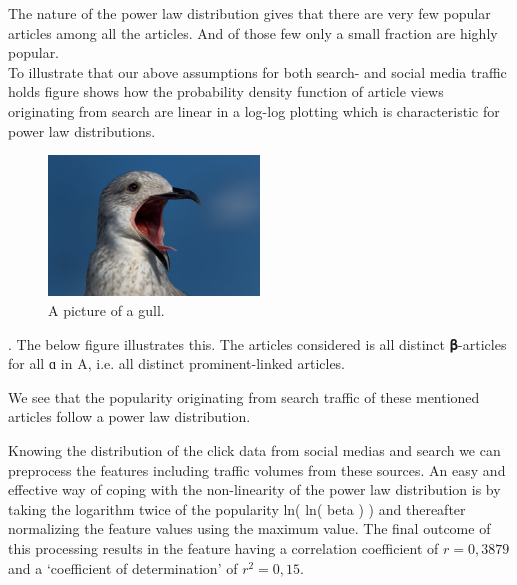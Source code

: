 The nature of the power law distribution gives that there are very few popular articles among all the articles. And of those few only a small fraction are highly popular.\\

To illustrate that our above assumptions for both search- and social media traffic holds figure  shows how the probability density function of article views originating from search are linear in a log-log plotting which is characteristic for power law distributions.\\


\begin{figure}[h]
  \caption{A picture of a gull.}
  \centering
    \includegraphics[width=0.5\textwidth]{images/gull}
\end{figure}

. The below figure illustrates this. The articles considered is all distinct 𝛃-articles for all ɑ in A, i.e. all distinct prominent-linked articles.

We see that the popularity originating from search traffic of these mentioned articles follow a power law distribution.

Knowing the distribution of the click data from social medias and search we can preprocess the features including traffic volumes from these sources. An easy and effective way of coping with the non-linearity of the power law distribution is by taking the logarithm twice of the popularity ln( ln( beta ) ) and thereafter normalizing the feature values using the maximum value.
The final outcome of this processing results in the feature having a correlation coefficient of $r = 0,3879$ and a `coefficient of determination' of $r^2 = 0,15$.  

